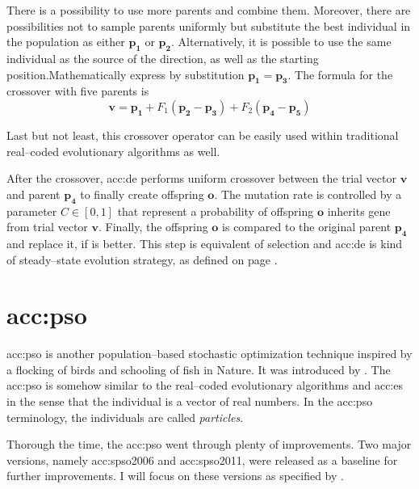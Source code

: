 There is a possibility to use more parents and combine them. Moreover, there are possibilities not to sample parents uniformly but substitute the best individual in the population as either $\mathbf{p_1}$ or $\mathbf{p_2}$. Alternatively, it is possible to use the same individual as the source of the direction, as well as the starting position.Mathematically  express by substitution $\mathbf{p_1} = \mathbf{p_3}$. The formula for the crossover with five parents is
$$
\mathbf{v} = \mathbf{p_1} + F_1\left( \mathbf{p_2} - \mathbf{p_3} \right) + F_2\left( \mathbf{p_4} - \mathbf{p_5} \right)
$$

Last but not least, this crossover operator can be easily used within traditional real--coded evolutionary algorithms as well.

After the crossover, \acrshort{acc:de} performs uniform crossover between the trial vector $\mathbf{v}$ and parent $\mathbf{p_4}$ to finally create offspring $\mathbf{o}$. The mutation rate is controlled by a parameter $C\in\left[0,1\right]$ that represent a probability of offspring $\mathbf{o}$ inherits gene from trial vector $\mathbf{v}$. Finally, the offspring $\mathbf{o}$ is compared to the original parent $\mathbf{p_4}$ and replace it, if is better. This step is equivalent of selection and \acrshort{acc:de} is kind of steady--state evolution strategy, as defined on page \pageref{enum:steadystate}.




\section{\texorpdfstring{\acrlong*{acc:pso}}{Particle swarm optimization}}

\acrfull{acc:pso} is another population--based stochastic optimization technique inspired by a flocking of birds and schooling of fish in Nature. It was introduced by \citet*{PSOOriginal}. The \acrshort{acc:pso} is somehow similar to the real--coded evolutionary algorithms and \acrshort{acc:es} in the sense that the individual is a vector of real numbers. In the \acrshort{acc:pso} terminology, the individuals are called \emph{particles}.

Thorough the time, the \acrshort{acc:pso} went through plenty of improvements. Two major versions, namely \acrfull{acc:spso2006} and \acrfull{acc:spso2011}, were released as a baseline for further improvements. I will focus on these versions as specified by \citet{SPSO}.

